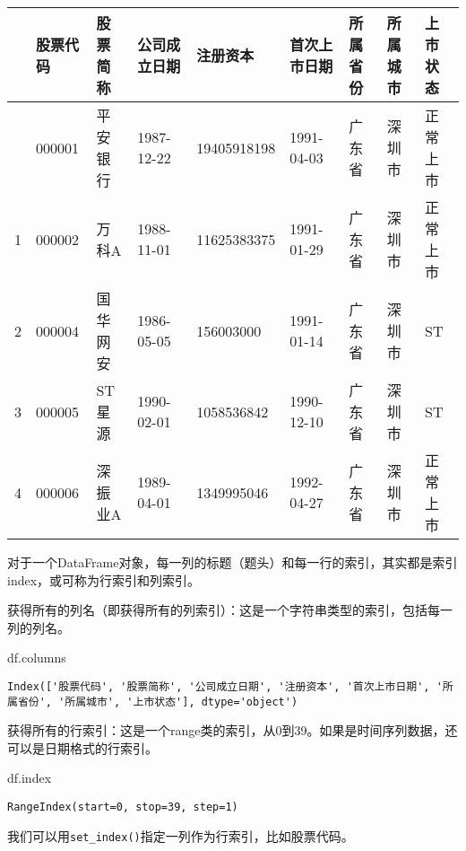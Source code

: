 \documentclass[
  letterpaper,
  DIV=11,
  numbers=noendperiod]{scrreprt}
\newenvironment{Shaded}{\begin{snugshade}}{\end{snugshade}}
\newcommand{\NormalTok}[1]{\textcolor[rgb]{0.00,0.23,0.31}{#1}}
\begin{document}
\begin{longtable}[]{@{}lllllllll@{}}
\toprule\noalign{}
& 股票代码 & 股票简称 & 公司成立日期 & 注册资本 & 首次上市日期 &
所属省份 & 所属城市 & 上市状态 \\
\midrule\noalign{}
\endhead
\bottomrule\noalign{}
\endlastfoot
0 & 000001 & 平安银行 & 1987-12-22 & 19405918198 & 1991-04-03 & 广东省 &
深圳市 & 正常上市 \\
1 & 000002 & 万科A & 1988-11-01 & 11625383375 & 1991-01-29 & 广东省 &
深圳市 & 正常上市 \\
2 & 000004 & 国华网安 & 1986-05-05 & 156003000 & 1991-01-14 & 广东省 &
深圳市 & ST \\
3 & 000005 & ST 星源 & 1990-02-01 & 1058536842 & 1990-12-10 & 广东省 &
深圳市 & ST \\
4 & 000006 & 深振业A & 1989-04-01 & 1349995046 & 1992-04-27 & 广东省 &
深圳市 & 正常上市 \\
\end{longtable}

对于一个DataFrame对象，每一列的标题（题头）和每一行的索引，其实都是索引index，或可称为行索引和列索引。

获得所有的列名（即获得所有的列索引）：这是一个字符串类型的索引，包括每一列的列名。

\begin{Shaded}
\begin{Highlighting}[]
\NormalTok{df.columns}
\end{Highlighting}
\end{Shaded}

\begin{verbatim}
Index(['股票代码', '股票简称', '公司成立日期', '注册资本', '首次上市日期', '所属省份', '所属城市', '上市状态'], dtype='object')
\end{verbatim}

获得所有的行索引：这是一个range类的索引，从0到39。如果是时间序列数据，还可以是日期格式的行索引。

\begin{Shaded}
\begin{Highlighting}[]
\NormalTok{df.index}
\end{Highlighting}
\end{Shaded}

\begin{verbatim}
RangeIndex(start=0, stop=39, step=1)
\end{verbatim}

我们可以用\texttt{set\_index()}指定一列作为行索引，比如股票代码。
\end{document}
